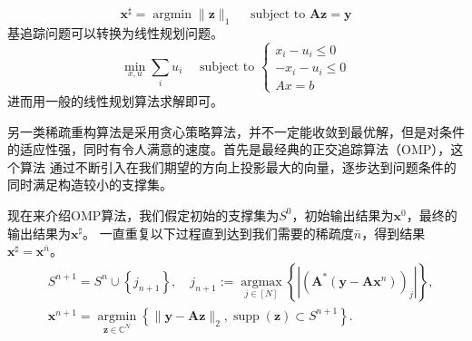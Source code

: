 \begin{equation}
    \mathbf{x}^{\sharp}=\operatorname{argmin}\|\mathbf{z}\|_1 \quad \text { subject to } \mathbf{A z}=\mathbf{y}
\end{equation}
基追踪问题可以转换为线性规划问题。
\begin{equation}
    \min _{x,u} \sum_i u_i \quad \text { subject to } \begin{cases}
    x_i-u_i  \leq 0 \\
    -x_i-u_i  \leq 0\\
    A x  =b
    \end{cases}
\end{equation}
进而用一般的线性规划算法求解即可。\par
另一类稀疏重构算法是采用贪心策略算法，并不一定能收敛到最优解，但是对条件的适应性强，同时有令人满意的速度。首先是最经典的正交追踪算法（OMP），这个算法
通过不断引入在我们期望的方向上投影最大的向量，逐步达到问题条件的同时满足构造较小的支撑集。\par

现在来介绍OMP算法，我们假定初始的支撑集为$S^0$，初始输出结果为$\mathbf{x}^0$，最终的输出结果为$\mathbf{x}^{\sharp}$。
一直重复以下过程直到达到我们需要的稀疏度$\bar{n}$，得到结果$\mathbf{x}^{\sharp}=\mathbf{x}^{\bar{n}}$。
\begin{equation}
    \begin{aligned}
    & S^{n+1}=S^n \cup\left\{j_{n+1}\right\}, \quad j_{n+1}:=\underset{j \in[N]}{\operatorname{argmax}}\left\{\left|\left(\mathbf{A}^*\left(\mathbf{y}-\mathbf{A} \mathbf{x}^n\right)\right)_j\right|\right\}, \\
    & \mathbf{x}^{n+1}=\underset{\mathbf{z} \in \mathbb{C}^N}{\operatorname{argmin}}\left\{\|\mathbf{y}-\mathbf{A} \mathbf{z}\|_2, \operatorname{supp}(\mathbf{z}) \subset S^{n+1}\right\} .
    \end{aligned}
\end{equation}

